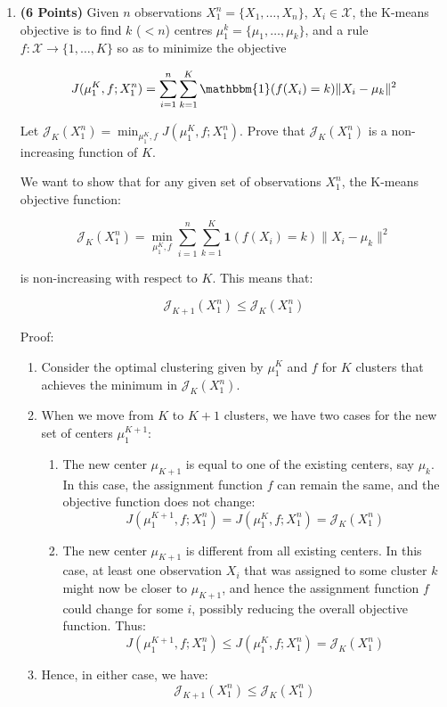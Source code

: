 \documentclass[a4paper]{article}
\newcommand{\Xcal}{\mathcal{X}}
\newcommand{\Jcal}{\mathcal{J}}
\newcommand{\indfone}{\mathbbm{1}}
\theoremstyle{definition}
\newenvironment{soln}{
    \leavevmode\color{blue}\ignorespaces
}{}
\begin{document}
\begin{enumerate}

\item \textbf{(6 Points)}
Given $n$ observations $X_1^n = \{X_1, \dots, X_n\}$, $X_i \in \Xcal$, the K-means objective
is to find $k$
($<n$) centres $\mu_1^k = \{\mu_1, \dots, \mu_k\}$, and a rule $f:\Xcal \rightarrow
\{1,\dots, K\}$ so as to minimize the objective

\begin{equation}
J(\mu_1^K, f; X_1^n) = \sum_{i=1}^n \sum_{k=1}^K \indfone(f(X_i) = k) \|X_i - \mu_k\|^2
\label{eqn:kmeans}
\end{equation}

Let $\Jcal_K(X_1^n) = \min_{\mu_1^K, f} J(\mu_1^K, f; X_1^n)$. Prove that
$\Jcal_{K}(X_1^n)$ is a non-increasing function of $K$.\\

\begin{soln}
We want to show that for any given set of observations \(X_1^n\), the K-means objective function:

\[
\Jcal_{K}(X_1^n) = \min_{\mu_1^K, f} \sum_{i=1}^n \sum_{k=1}^K \mathbf{1}(f(X_i) = k) \|X_i - \mu_k\|^2
\]

is non-increasing with respect to \(K\). This means that:

\[
\Jcal_{K+1}(X_1^n) \leq \Jcal_{K}(X_1^n)
\]

Proof:

\begin{enumerate}
    \item Consider the optimal clustering given by \(\mu_1^K\) and \(f\) for \(K\) clusters that achieves the minimum in \(\Jcal_{K}(X_1^n)\).
    \item When we move from \(K\) to \(K+1\) clusters, we have two cases for the new set of centers \(\mu_1^{K+1}\):
    \begin{enumerate}
        \item The new center \(\mu_{K+1}\) is equal to one of the existing centers, say \(\mu_k\). In this case, the assignment function \(f\) can remain the same, and the objective function does not change:
        \[
        J(\mu_1^{K+1}, f; X_1^n) = J(\mu_1^K, f; X_1^n) = \Jcal_{K}(X_1^n)
        \]
        \item The new center \(\mu_{K+1}\) is different from all existing centers. In this case, at least one observation \(X_i\) that was assigned to some cluster \(k\) might now be closer to \(\mu_{K+1}\), and hence the assignment function \(f\) could change for some \(i\), possibly reducing the overall objective function. Thus:
        \[
        J(\mu_1^{K+1}, f; X_1^n) \leq J(\mu_1^K, f; X_1^n) = \Jcal_{K}(X_1^n)
        \]
    \end{enumerate}
    \item Hence, in either case, we have:
    \[
    \Jcal_{K+1}(X_1^n) \leq \Jcal_{K}(X_1^n)
    \]
\end{enumerate}


\end{soln}
\end{enumerate}
\end{document}
